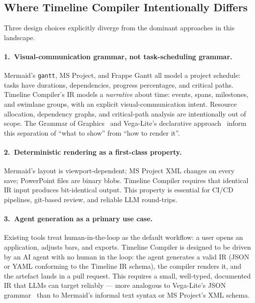 \subsection{Where Timeline Compiler Intentionally Differs}
\label{sec:comparison-intent}

Three design choices explicitly diverge from the dominant approaches in
this landscape.

\paragraph{1.\ Visual-communication grammar, not task-scheduling grammar.}
Mermaid's \texttt{gantt}, MS Project, and Frappe Gantt all model a project
schedule: tasks have durations, dependencies, progress percentages, and
critical paths.
Timeline Compiler's IR models a \emph{narrative} about time: events, spans,
milestones, and swimlane groups, with an explicit visual-communication intent.
Resource allocation, dependency graphs, and critical-path analysis are
intentionally out of scope.
The Grammar of Graphics~\cite{grammarofgraphics2005} and Vega-Lite's
declarative approach~\cite{vegalite2017} inform this separation of
``what to show'' from ``how to render it''.

\paragraph{2.\ Deterministic rendering as a first-class property.}
Mermaid's layout is viewport-dependent; MS Project XML changes on every
save; PowerPoint files are binary blobs.
Timeline Compiler requires that identical IR input produces bit-identical
output.
This property is essential for CI/CD pipelines, git-based review, and
reliable LLM round-trips.

\paragraph{3.\ Agent generation as a primary use case.}
Existing tools treat human-in-the-loop as the default workflow: a user
opens an application, adjusts bars, and exports.
Timeline Compiler is designed to be driven by an AI agent with no human in
the loop: the agent generates a valid IR (JSON or YAML conforming to the
Timeline IR schema), the compiler renders it, and the artefact lands in
a pull request.
This requires a small, well-typed, documented IR that LLMs can target
reliably --- more analogous to Vega-Lite's JSON grammar~\cite{vegalite2017}
than to Mermaid's informal text syntax or MS Project's XML schema.

